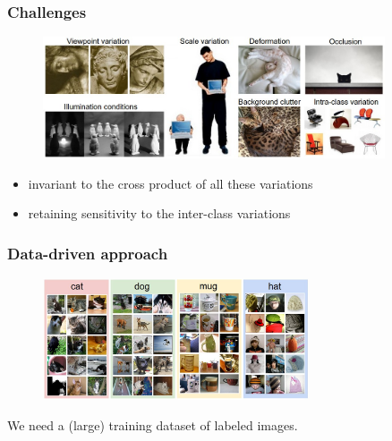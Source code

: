 \begin{frame}
	\frametitle{Challenges}

	\centering
        \begin{figure}
                \includegraphics[width=0.9\textwidth]{Pics/challenges.jpeg}
        \end{figure}

	\begin{itemize}
		\item invariant to the cross product of all these variations
		\item retaining sensitivity to the inter-class variations
	\end{itemize}

\end{frame}

\begin{frame}
	\frametitle{Data-driven approach}

	\centering
        \begin{figure}
                \includegraphics[width=0.7\textwidth]{Pics/trainset.jpg} \\
        \end{figure}

	We need a (large) training dataset of labeled images. 

\end{frame}

